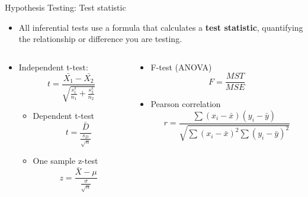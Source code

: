 \documentclass[
  ignorenonframetext,
]{beamer}
\providecommand{\tightlist}{%
  \setlength{\itemsep}{0pt}\setlength{\parskip}{0pt}}
\begin{document}
\begin{frame}{Hypothesis Testing: Test statistic}
\label{hypothesis-testing-test-statistic}
\begin{itemize}
\tightlist
\item
  All inferential tests use a formula that calculates a \textbf{test
  statistic}, quantifying the relationship or difference you are
  testing.
\end{itemize}

\begin{columns}[T]
\begin{column}{0.48\textwidth}
\small

\begin{itemize}
\item
  Independent t-test:
  \[t = \frac{\bar{X_1} - \bar{X_2}}{\sqrt{\frac{s_1^2}{n_1} + \frac{s_2^2}{n_2}}}\]

  \begin{itemize}
  \item
    Dependent t-test \[t = \frac{\bar{D}}{\frac{s_D}{\sqrt{n}}}\]
  \item
    One sample z-test
    \[z = \frac{\bar{X} - \mu}{\frac{\sigma}{\sqrt{n}}}\] \small  
  \end{itemize}
\end{itemize}
\end{column}

\begin{column}{0.48\textwidth}
\small

\begin{itemize}
\item
  F-test (ANOVA) \[F = \frac{MST}{MSE}\]
\item
  Pearson correlation
  \[r = \frac{\sum (x_i - \bar{x})(y_i - \bar{y})}{\sqrt{\sum (x_i - \bar{x})^2 \sum (y_i - \bar{y})^2}}\]\\
\end{itemize}
\end{column}
\end{columns}
\end{frame}
\end{document}
